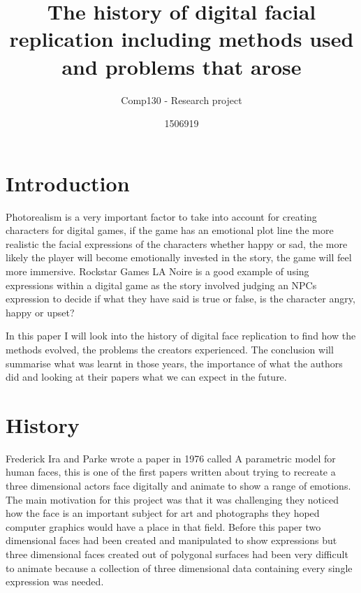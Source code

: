 \documentclass{scrartcl}
\title{The history of digital facial replication including methods used and problems that arose}
\subtitle{Comp130 - Research project}
\author{1506919}
\begin{document}
\maketitle


\section{Introduction}

Photorealism is a very important factor to take into account for creating characters for digital games, if the game has an emotional plot line the more realistic the facial expressions of the characters whether happy or sad, the more likely the player will become emotionally invested in the story, the game will feel more immersive\cite{Guardian2015}\cite{schneider2007exploring}. Rockstar Games LA Noire\cite{games2011noire} is a good example of using expressions within a digital game as the story involved judging an NPCs expression to decide if what they have said is true or false, is the character angry, happy or upset?\cite{liu2013game}

In this paper I will look into the history of digital face replication to find how the methods evolved, the problems the creators experienced. The conclusion will summarise what was learnt in those years, the importance of what the authors did and looking at their papers what we can expect in the future.

\section{History}

Frederick Ira and Parke wrote a paper in 1976 called A parametric model for human faces, this is one of the first papers written about trying to recreate a three dimensional actors face digitally and animate to show a range of emotions. The main motivation for this project was that it was challenging they noticed how the face is an important subject for art and photographs they hoped computer graphics would have a place in that field. Before this paper two dimensional faces had been created and manipulated to show expressions but three dimensional faces created out of polygonal surfaces had been very difficult to animate because a collection of three dimensional data containing every single expression was needed\cite{parke1974parametric}.
\end{document}
